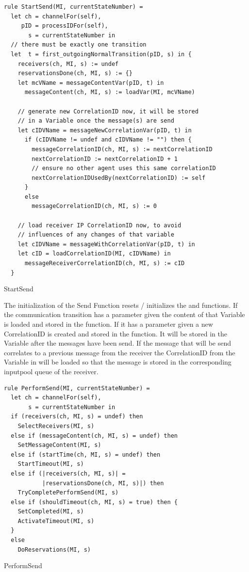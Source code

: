 \begin{listing}[htbp]
\begin{verbatim}
rule StartSend(MI, currentStateNumber) =
  let ch = channelFor(self),
     pID = processIDFor(self),
       s = currentStateNumber in
  // there must be exactly one transition
  let  t = first_outgoingNormalTransition(pID, s) in {
    receivers(ch, MI, s) := undef
    reservationsDone(ch, MI, s) := {}
    let mcVName = messageContentVar(pID, t) in
      messageContent(ch, MI, s) := loadVar(MI, mcVName)

    // generate new CorrelationID now, it will be stored
    // in a Variable once the message(s) are send
    let cIDVName = messageNewCorrelationVar(pID, t) in
      if (cIDVName != undef and cIDVName != "") then {
        messageCorrelationID(ch, MI, s) := nextCorrelationID
        nextCorrelationID := nextCorrelationID + 1
        // ensure no other agent uses this same correlationID
        nextCorrelationIDUsedBy(nextCorrelationID) := self
      }
      else
        messageCorrelationID(ch, MI, s) := 0

    // load receiver IP CorrelationID now, to avoid
    // influences of any changes of that variable
    let cIDVName = messageWithCorrelationVar(pID, t) in
    let cID = loadCorrelationID(MI, cIDVName) in
      messageReceiverCorrelationID(ch, MI, s) := cID
  }
\end{verbatim}
\caption{StartSend}
\label{lst:shortasm:StartSend}
\end{listing}


The initialization of the Send Function resets / initializes the  and
 functions.
If the communication transition has a  parameter given the
content of that Variable is loaded and stored in the 
function. If it has a  parameter given
a new CorrelationID is created and stored in the  function.
It will be stored in the Variable after the messages have been send.
If the message that will be send correlates to a previous message from the receiver
the CorrelationID from the Variable in  will be loaded
so that the message is stored in the corresponding inputpool queue of the receiver.


\begin{listing}[htbp]
\begin{verbatim}
rule PerformSend(MI, currentStateNumber) =
  let ch = channelFor(self),
       s = currentStateNumber in
  if (receivers(ch, MI, s) = undef) then
    SelectReceivers(MI, s)
  else if (messageContent(ch, MI, s) = undef) then
    SetMessageContent(MI, s)
  else if (startTime(ch, MI, s) = undef) then
    StartTimeout(MI, s)
  else if (|receivers(ch, MI, s)| =
           |reservationsDone(ch, MI, s)|) then
    TryCompletePerformSend(MI, s)
  else if (shouldTimeout(ch, MI, s) = true) then {
    SetCompleted(MI, s)
    ActivateTimeout(MI, s)
  }
  else
    DoReservations(MI, s)
\end{verbatim}
\caption{PerformSend}
\label{lst:shortasm:PerformSend}
\end{listing}


